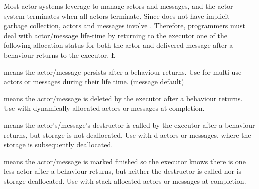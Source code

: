 \documentclass[openright,twoside]{report}
\begin{document}
Most actor systems leverage  to manage actors and messages, and the actor system terminates when all actors terminate.
Since \CC does not have implicit garbage collection, \uC actors and messages involve .
Therefore, programmers must deal with actor/message life-time by returning to the executor one of the following allocation status for both the actor and delivered message after a behaviour returns to the executor.
\LGinlinefalse\LGbegin\lgrinde
\L{}
\CE{}\endlgrinde\LGend
{}%
%
%
%
\vspace*{-15pt}%
\begin{prefix}
\item[\LGinlinetrue\LGbegin\lgrinde\L{\LB{\V{Nodelete}}}\endlgrinde\LGend{}] means the actor/message persists after a behaviour returns.
Use for multi-use actors or messages during their life time. (message default)
\item[\LGinlinetrue\LGbegin\lgrinde\L{\LB{\V{Delete}}}\endlgrinde\LGend{}] means the actor/message is deleted by the executor after a behaviour returns.
Use with dynamically allocated actors or messages at completion.
\item[\LGinlinetrue\LGbegin\lgrinde\L{\LB{\V{Destroy}}}\endlgrinde\LGend{}] means the actor's/message's destructor is called by the executor after a behaviour returns, but storage is not deallocated.
Use with d actors or messages, where the storage is subsequently deallocated.
\item[\LGinlinetrue\LGbegin\lgrinde\L{\LB{\V{Finished}}}\endlgrinde\LGend{}] means the actor/message is marked finished so the executor knows there is one less actor after a behaviour returns, but neither the destructor is called nor is storage deallocated.
Use with stack allocated actors or messages at completion.
\end{prefix}
\end{document}
